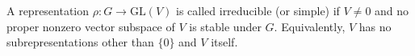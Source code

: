 A representation $\rho: G \to \mathrm{GL}(V)$ is called irreducible (or simple) if $V \neq 0$ and no proper nonzero vector subspace of $V$ is stable under $G$.
Equivalently, $V$ has no subrepresentations other than $\{0\}$ and $V$ itself.
